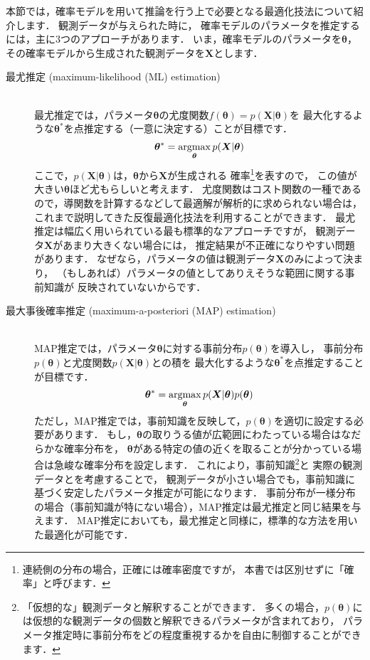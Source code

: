 本節では，確率モデルを用いて推論を行う上で必要となる最適化技法について紹介します．
観測データが与えられた時に，
確率モデルのパラメータを推定するには，主に3つのアプローチがあります．
いま，確率モデルのパラメータを$\bm\theta$，
その確率モデルから生成された観測データを$\bm{X}$とします．
\begin{description}
\item[最尤推定 (maximum-likelihood (ML) estimation)] \ \\
最尤推定では，パラメータ$\bm\theta$の尤度関数$f(\bm\theta) = p(\bm{X}|\bm\theta)$を
最大化するような$\bm\theta^*$を点推定する（一意に決定する）ことが目標です．
\begin{align}
\bm\theta^* = \mathop{\mathrm{argmax}}_{\bm\theta} p(\bm{X}|\bm\theta)
\end{align}
ここで，$p(\bm{X}|\bm\theta)$は，$\bm\theta$から$\bm{X}$が生成される
確率\footnote{連続側の分布の場合，正確には確率密度ですが，
本書では区別せずに「確率」と呼びます．}を表すので，
この値が大きい$\bm\theta$ほど尤もらしいと考えます．
尤度関数はコスト関数の一種であるので，導関数を計算するなどして最適解が解析的に求められない場合は，
これまで説明してきた反復最適化技法を利用することができます．
最尤推定は幅広く用いられている最も標準的なアプローチですが，
観測データ$\bm{X}$があまり大きくない場合には，
推定結果が不正確になりやすい問題があります．
なぜなら，パラメータの値は観測データ$\bm{X}$のみによって決まり，
（もしあれば）パラメータの値としてありえそうな範囲に関する事前知識が
反映されていないからです．

\item[最大事後確率推定 (maximum-a-posteriori (MAP) estimation)] \ \\
MAP推定では，パラメータ$\bm\theta$に対する事前分布$p(\bm\theta)$を導入し，
事前分布$p(\bm\theta)$と尤度関数$p(\bm{X}|\bm\theta)$との積を
最大化するような$\bm\theta^*$を点推定することが目標です．
\begin{align}
\bm\theta^* = \mathop{\mathrm{argmax}}_{\bm\theta} p(\bm{X}|\bm\theta) p(\bm\theta)
\end{align}
ただし，MAP推定では，事前知識を反映して，$p(\bm\theta)$を適切に設定する必要があります．
もし，$\bm\theta$の取りうる値が広範囲にわたっている場合はなだらかな確率分布を，
$\bm\theta$がある特定の値の近くを取ることが分かっている場合は急峻な確率分布を設定します．
これにより，事前知識\footnote{「仮想的な」観測データと解釈することができます．
多くの場合，$p(\bm\theta)$には仮想的な観測データの個数と解釈できるパラメータが含まれており，
パラメータ推定時に事前分布をどの程度重視するかを自由に制御することができます．}と
実際の観測データとを考慮することで，
観測データが小さい場合でも，事前知識に基づく安定したパラメータ推定が可能になります．
事前分布が一様分布の場合（事前知識が特にない場合），MAP推定は最尤推定と同じ結果を与えます．
MAP推定においても，最尤推定と同様に，標準的な方法を用いた最適化が可能です．


\end{description}
